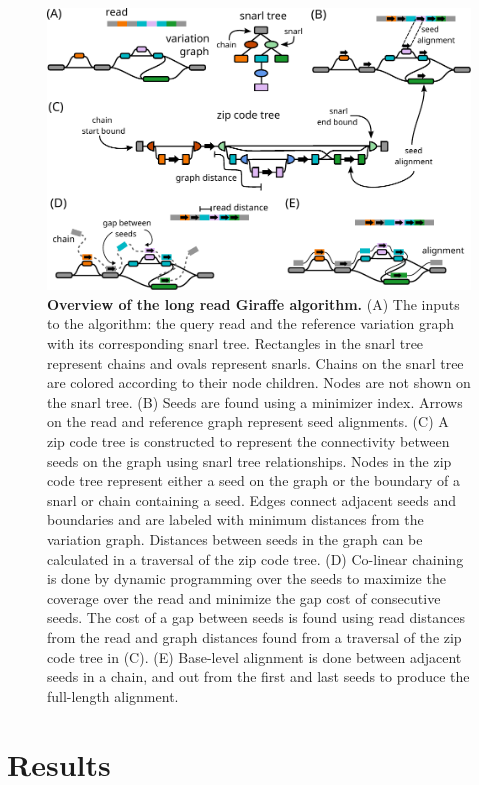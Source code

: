 \documentclass[11pt]{ucscthesis}
\begin{document}
\begin{figure}[htp]
    \centering
    \includegraphics[width=\columnwidth]{lr_giraffe_algorithm_overview.pdf}
    \caption[Overview of the long read Giraffe algorithm]{\textbf{Overview of the long read Giraffe algorithm.} (A) The inputs to the algorithm: the query read and the reference variation graph with its corresponding snarl tree. Rectangles in the snarl tree represent chains and ovals represent snarls. Chains on the snarl tree are colored according to their node children. Nodes are not shown on the snarl tree.
    (B) Seeds are found using a minimizer index. Arrows on the read and reference graph represent seed alignments. (C) A zip code tree is constructed to represent the connectivity between seeds on the graph using snarl tree relationships. Nodes in the zip code tree represent either a seed on the graph or the boundary of a snarl or chain containing a seed. Edges connect adjacent seeds and boundaries and are labeled with minimum distances from the variation graph. Distances between seeds in the graph can be calculated in a traversal of the zip code tree. (D) Co-linear chaining is done by dynamic programming over the seeds to maximize the coverage over the read and minimize the gap cost of consecutive seeds. The cost of a gap between seeds is found using read distances from the read and graph distances found from a traversal of the zip code tree in (C). (E) Base-level alignment is done between adjacent seeds in a chain, and out from the first and last seeds to produce the full-length alignment. }
    \label{fig:lr_algorithm_overview}
\end{figure}

\section{Results}
\end{document}
